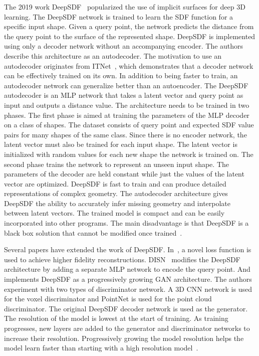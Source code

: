 The 2019 work DeepSDF~\cite{Park2019} popularized the use of implicit surfaces for deep 3D learning. The DeepSDF network is trained to learn the SDF function for a specific input shape. Given a query point, the network predicts the distance from the query point to the surface of the represented shape. DeepSDF is implemented using only a decoder network without an accompanying encoder. The authors describe this architecture as an autodecoder. The motivation to use an autodecoder originates from ITNet~\cite{Tan1995}, which demonstrates that a decoder network can be effectively trained on its own. In addition to being faster to train, an autodecoder network can generalize better than an autoencoder. The DeepSDF autodecoder is an MLP network that takes a latent vector and query point as input and outputs a distance value. The architecture needs to be trained in two phases. The first phase is aimed at training the parameters of the MLP decoder on a class of shapes. The dataset consists of query point and expected SDF value pairs for many shapes of the same class. Since there is no encoder network, the latent vector must also be trained for each input shape. The latent vector is initialized with random values for each new shape the network is trained on. The second phase trains the network to represent an unseen input shape. The parameters of the decoder are held constant while just the values of the latent vector are optimized. DeepSDF is fast to train and can produce detailed representations of complex geometry. The autodecoder architecture gives DeepSDF the ability to accurately infer missing geometry and interpolate between latent vectors. The trained model is compact and can be easily incorporated into other programs. The main disadvantage is that DeepSDF is a black box solution that cannot be modified once trained~\cite{Park2019}.

Several papers have extended the work of DeepSDF. In~\cite{Gropp2020}, a novel loss function is used to achieve higher fidelity reconstructions. DISN~\cite{Xu2019} modifies the DeepSDF architecture by adding a separate MLP network to encode the query point. And \cite{Kleineberg2020} implements DeepSDF as a progressively growing GAN architecture. The authors experiment with two types of discriminator network. A 3D CNN network is used for the voxel discriminator and PointNet is used for the point cloud discriminator. The original DeepSDF decoder network is used as the generator. The resolution of the model is lowest at the start of training. As training progresses, new layers are added to the generator and discriminator networks to increase their resolution. Progressively growing the model resolution helps the model learn faster than starting with a high resolution model~\cite{Kleineberg2020}.

